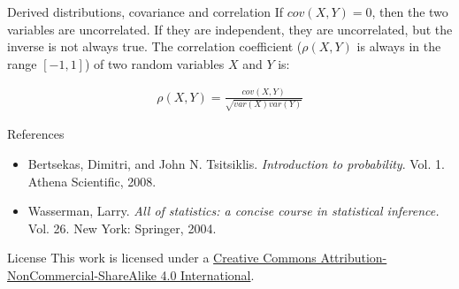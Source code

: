 \documentclass{beamer}
\begin{document}
\begin{frame}
\begin{columns}
\begin{column}{0.3\textwidth}
\begin{block}{Derived distributions, covariance and correlation}
If $cov(X, Y) = 0$, then the two variables are uncorrelated. If they are independent, they are uncorrelated, but the inverse is not always true. The correlation coefficient ($\rho(X, Y)$ is always in the range $[-1,1]$) of two random variables $X$ and $Y$ is:

\begin{align*}
    \rho(X, Y) = \frac{cov(X, Y)}{\sqrt{var(X)var(Y)}} 
\end{align*}

\end{block} 

\begin{block}{References}
    \begin{itemize}
        \item Bertsekas, Dimitri, and John N. Tsitsiklis. \textit{Introduction to probability}. Vol. 1. Athena Scientific, 2008.
        \item Wasserman, Larry. \textit{All of statistics: a concise course in statistical inference.} Vol. 26. New York: Springer, 2004.
    \end{itemize}
\end{block}

\begin{block}{License}
This work is licensed under a \href{https://creativecommons.org/licenses/by-nc-sa/4.0/}{Creative Commons Attribution-NonCommercial-ShareAlike 4.0 International}. \ccbyncsa
\end{block}

\end{column}


\end{columns}

\end{frame}
\end{document}
